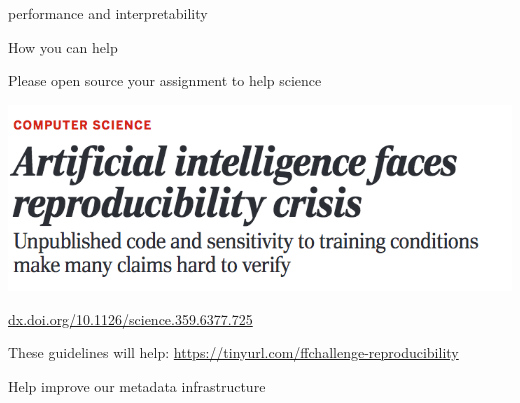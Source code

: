 \documentclass{beamer}
\begin{document}
\begin{frame}

performance and interpretability

\end{frame}
\begin{frame}

\begin{center}
\Large{How you can help}
\end{center}

\end{frame}
\begin{frame}

\begin{center}
\Large{Please open source your assignment to help science}
\end{center}

\end{frame}
\begin{frame}

\begin{center}
\includegraphics[width=\textwidth]{figures/hutson_artificial_2018_title}\\
\end{center}
{\tiny \textcolor{blue}{\url{dx.doi.org/10.1126/science.359.6377.725}}}

\pause
\vfill

These guidelines will help: \url{https://tinyurl.com/ffchallenge-reproducibility}

\end{frame}
\begin{frame}

\begin{center}
\Large{Help improve our metadata infrastructure}
\end{center}

\end{frame}
\end{document}
